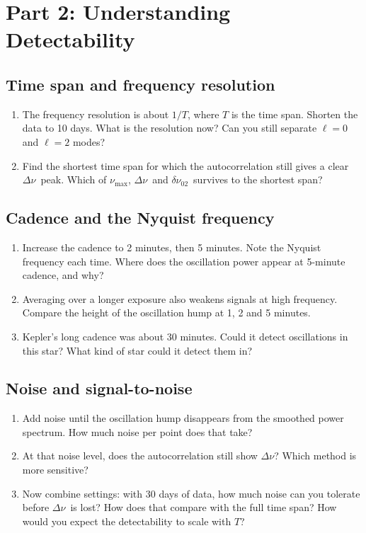 \documentclass[11pt]{article}
\newcommand{\numax}{\ensuremath{\nu_\mathrm{max}}}
\newcommand{\dnu}{\ensuremath{\Delta\nu}}
\newcommand{\dnuzt}{\ensuremath{\delta\nu_{02}}}
\newcommand{\answer}[1][3cm]{\par\vspace{#1}}
\begin{document}
\newpage
\section*{Part 2: Understanding Detectability}

\subsection*{Time span and frequency resolution}
\begin{enumerate}[series=det]
  \item The frequency resolution is about $1/T$, where $T$ is the time span. Shorten the
        data to 10 days. What is the resolution now? Can you still separate $\ell = 0$ and
        $\ell = 2$ modes?
        \answer
  \item Find the shortest time span for which the autocorrelation still gives a clear \dnu\
        peak. Which of \numax, \dnu\ and \dnuzt\ survives to the shortest span?
        \answer
\end{enumerate}

\subsection*{Cadence and the Nyquist frequency}
\begin{enumerate}[resume=det]
  \item Increase the cadence to 2 minutes, then 5 minutes. Note the Nyquist frequency each
        time. Where does the oscillation power appear at 5-minute cadence, and why?
        \answer
  \item Averaging over a longer exposure also weakens signals at high frequency. Compare
        the height of the oscillation hump at 1, 2 and 5 minutes.
        \answer
  \item Kepler's long cadence was about 30 minutes. Could it detect oscillations in this
        star? What kind of star could it detect them in?
        \answer
\end{enumerate}

\subsection*{Noise and signal-to-noise}
\begin{enumerate}[resume=det]
  \item Add noise until the oscillation hump disappears from the smoothed power spectrum.
        How much noise per point does that take?
        \answer[2cm]
  \item At that noise level, does the autocorrelation still show \dnu? Which method is more
        sensitive?
        \answer
  \item Now combine settings: with 30 days of data, how much noise can you tolerate before
        \dnu\ is lost? How does that compare with the full time span? How would you expect
        the detectability to scale with $T$?
        \answer[4cm]
\end{enumerate}
\end{document}
